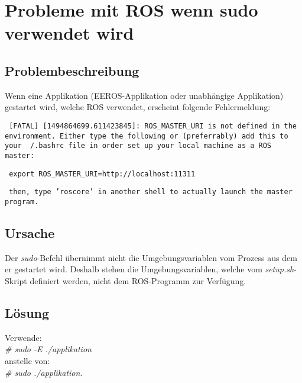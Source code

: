 \section{Probleme mit ROS wenn sudo verwendet wird}
\subsection{Problembeschreibung}
Wenn eine Applikation (EEROS-Applikation oder unabhängige Applikation) gestartet wird, welche ROS verwendet, erscheint folgende Fehlermeldung:


\texttt{
[FATAL] [1494864699.611423845]: ROS\_MASTER\_URI is not defined in the environment. Either type the following or (preferrably) add this to your ~/.bashrc file in order set up your local machine as a ROS master:
}

\texttt{
export ROS\_MASTER\_URI=http://localhost:11311
}

\texttt{
then, type 'roscore' in another shell to actually launch the master program.
}

\subsection{Ursache}
Der \textit{sudo}-Befehl übernimmt nicht die Umgebungsvariablen vom Prozess aus dem er gestartet wird.
Deshalb stehen die Umgebungsvariablen, welche vom \textit{setup.sh}-Skript definiert werden, nicht dem ROS-Programm zur Verfügung.

\subsection{Lösung}
Verwende: \\
\textit{\# sudo -E ./applikation} \\
anstelle von: \\
\textit{\# sudo ./applikation}.
